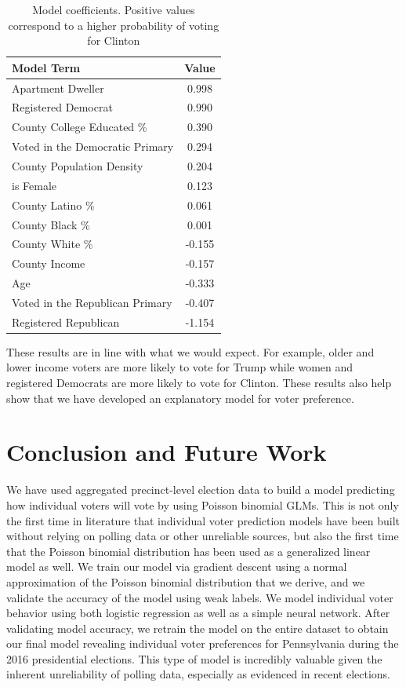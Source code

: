 \documentclass[10pt, letterpaper]{article}
\begin{document}
\begin{multicols}{2}
\begin{table}[H]
\centering
\begin{tabular}{|l|c|}
\hline
Model Term & Value \\
\hline 
Apartment Dweller & 0.998  \\
Registered Democrat & 0.990  \\
County College Educated \% & 0.390  \\
Voted in the Democratic Primary & 0.294  \\
County Population Density & 0.204  \\
is Female & 0.123  \\
County Latino \% & 0.061  \\
County Black \% & 0.001  \\
County White \% & -0.155  \\
County Income & -0.157  \\
Age & -0.333  \\
Voted in the Republican Primary & -0.407  \\
Registered Republican & -1.154  \\
\hline
\end{tabular}
\label{table:coeff}
\caption{Model coefficients. Positive values correspond to a higher probability of voting for Clinton}
\end{table}

These results are in line with what we would expect. For example, older and lower income voters are more likely to vote for Trump while women and registered Democrats are more likely to vote for Clinton. These results also help show that we have developed an explanatory model for voter preference. 

\section*{Conclusion and Future Work}

We have used aggregated precinct-level election data to build a model predicting how individual voters will vote by using Poisson binomial GLMs. This is not only the first time in literature that individual voter prediction models have been built without relying on polling data or other unreliable sources, but also the first time that the Poisson binomial distribution has been used as a generalized linear model as well. We train our model via gradient descent using a normal approximation of the Poisson binomial distribution that we derive, and we validate the accuracy of the model using weak labels. We model individual voter behavior using both logistic regression as well as a simple neural network. After validating model accuracy, we retrain the model on the entire dataset to obtain our final model revealing individual voter preferences for Pennsylvania during the 2016 presidential elections. This type of model is incredibly valuable given the inherent unreliability of polling data, especially as evidenced in recent elections.


\end{multicols}
\end{document}
